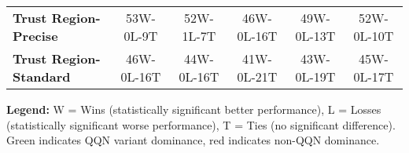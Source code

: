 \documentclass{article}
\begin{document}
\begin{table}[htbp]
{\begin{tabular}{lccccc}
\textbf{Trust Region-Precise} & \textcolor{green!70!black}{53W-0L-9T} & \textcolor{green!70!black}{52W-1L-7T} & \textcolor{green!70!black}{46W-0L-16T} & \textcolor{green!70!black}{49W-0L-13T} & \textcolor{green!70!black}{52W-0L-10T} \\
\textbf{Trust Region-Standard} & \textcolor{green!70!black}{46W-0L-16T} & \textcolor{green!70!black}{44W-0L-16T} & \textcolor{green!70!black}{41W-0L-21T} & \textcolor{green!70!black}{43W-0L-19T} & \textcolor{green!70!black}{45W-0L-17T} \\
\bottomrule
\end{tabular}
}
\end{table}
\textbf{Legend:} W = Wins (statistically significant better performance), L = Losses (statistically significant worse performance), T = Ties (no significant difference). Green indicates QQN variant dominance, red indicates non-QQN dominance.
\end{document}
